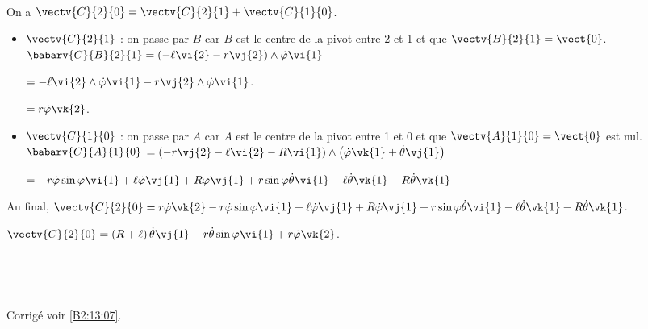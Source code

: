 \ifprof ~\\
On a $\vectv{C}{2}{0}= \vectv{C}{2}{1}+\vectv{C}{1}{0}$.
\begin{itemize}
\item $\vectv{C}{2}{1}$ : on passe par $B$ car $B$ est le centre de la pivot entre 2 et 1 et que $\vectv{B}{2}{1}=\vect{0}$. 
$\babarv{C}{B}{2}{1} =\left(-\ell\vi{2}-r\vj{2} \right)\wedge \dot{\varphi}\vi{1} $ 

$=-\ell\vi{2}\wedge \dot{\varphi}\vi{1}-r\vj{2} \wedge \dot{\varphi}\vi{1}$.

$=r\dot{\varphi}\vk{2}$.

\item $\vectv{C}{1}{0}$ : on passe par $A$ car $A$ est le centre de la pivot entre 1 et 0 et que $\vectv{A}{1}{0}=\vect{0}$ est nul. 
$\babarv{C}{A}{1}{0}$ 
$=\left(-r\vj{2}-\ell\vi{2}-R\vi{1}\right)\wedge \left(\dot{\varphi}\vk{1}+\dot{\theta}\vj{1}\right)$



$=-r\dot{\varphi}  \sin\varphi \vi{1} +\ell\dot{\varphi}\vj{1}+R\dot{\varphi}\vj{1}
+r\sin\varphi\dot{\theta}\vi{1}-\ell \dot{\theta}\vk{1}-R \dot{\theta}\vk{1}$%
\end{itemize}

Au final, 
 $\vectv{C}{2}{0}=r\dot{\varphi}\vk{2}-r\dot{\varphi}  \sin\varphi \vi{1} +\ell\dot{\varphi}\vj{1}+R\dot{\varphi}\vj{1}
+r\sin\varphi\dot{\theta}\vi{1}-\ell \dot{\theta}\vk{1}-R \dot{\theta}\vk{1}$.
\else
\fi

$\vectv{C}{2}{0}= \left(R+\ell\right)\dot{\theta}\vj{1} -r\dot{\theta}\sin\varphi \vi{1} + r\dot{\varphi}\vk{2}$.

\ifprof ~\\
\else
\fi

\ifprof ~\\
\else
\fi


\ifprof
\else
\begin{flushright}
\footnotesize{Corrigé  voir \ref{B2:13:07}.}
\end{flushright}%
\fi